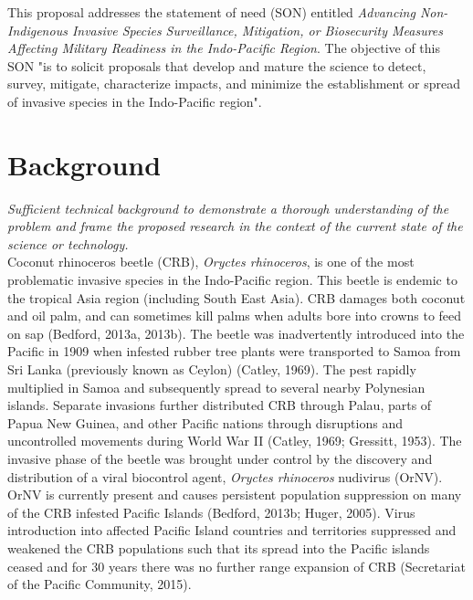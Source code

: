 \documentclass[11pt,english,letterpaper]{scrartcl}
\begin{document}
This proposal addresses the statement of need (SON) entitled \textit{Advancing Non-Indigenous Invasive Species Surveillance, Mitigation, or Biosecurity Measures Affecting Military Readiness in the Indo-Pacific Region}. The objective of this SON "is to solicit proposals that develop and mature the science to detect, survey, mitigate, characterize impacts, and minimize the establishment or spread of invasive species in the Indo-Pacific region".


\section{Background}

\textit{Sufficient technical background to demonstrate a thorough understanding of the problem and frame the proposed research in the context of the current state of the science or technology.}\\

Coconut rhinoceros beetle (CRB), \textit{Oryctes rhinoceros}, is one of the most problematic invasive species in the Indo-Pacific region. This beetle is endemic to the tropical Asia region (including South East Asia). CRB damages both coconut and oil palm, and can sometimes kill palms when adults bore into crowns to feed on sap \cite{Bedford2013} (Bedford, 2013a, 2013b). The beetle was inadvertently introduced into the Pacific in 1909 when infested rubber tree plants were transported to Samoa from Sri Lanka (previously known as Ceylon) (Catley, 1969). The pest rapidly multiplied in Samoa and subsequently spread to several nearby Polynesian islands. Separate invasions further distributed CRB through Palau, parts of Papua New Guinea, and other Pacific nations through disruptions and uncontrolled movements during World War II (Catley, 1969; Gressitt, 1953). The invasive phase of the beetle was brought under control by the discovery and distribution of a viral biocontrol agent, \textit{Oryctes rhinoceros} nudivirus (OrNV). OrNV is currently present and causes persistent population suppression on many of the CRB infested Pacific Islands (Bedford, 2013b; Huger, 2005). Virus introduction into affected Pacific Island countries and territories suppressed and weakened the CRB populations such that its spread into the Pacific islands ceased and for 30 years there was no further range expansion of CRB (Secretariat of the Pacific Community, 2015). 
\end{document}
